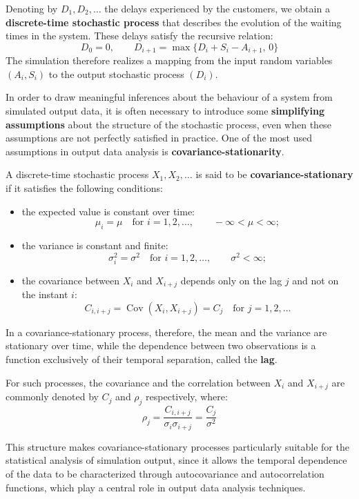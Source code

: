 Denoting by $D_1, D_2, \dots$ the delays experienced by the customers, we obtain a \textbf{discrete-time stochastic process} that describes the evolution of the waiting times in the system. These delays satisfy the recursive relation:
\[
D_0 = 0, \qquad
D_{i+1} = \max\{D_i + S_i - A_{i+1},\, 0\}
\]
The simulation therefore realizes a mapping from the input random variables $(A_i, S_i)$ to the output stochastic process $(D_i)$.

In order to draw meaningful inferences about the behaviour of a system from simulated output data, it is often necessary to introduce some \textbf{simplifying assumptions} about the structure of the stochastic process, even when these assumptions are not perfectly satisfied in practice. One of the most used assumptions in output data analysis is \textbf{covariance-stationarity}.

A discrete-time stochastic process $X_1, X_2, \dots$ is said to be \textbf{covariance-stationary} if it satisfies the following conditions:
\begin{itemize}
    \item the expected value is constant over time:
    \[
    \mu_i = \mu \quad \text{for } i = 1,2,\dots, \qquad -\infty < \mu < \infty;
    \]
    \item the variance is constant and finite:
    \[
    \sigma_i^2 = \sigma^2 \quad \text{for } i = 1,2,\dots, \qquad \sigma^2 < \infty;
    \]
    \item the covariance between $X_i$ and $X_{i+j}$ depends only on the lag $j$ and not on the instant $i$:
    \[
    C_{i,i+j} = \operatorname{Cov}(X_i, X_{i+j}) = C_j \quad \text{for } j = 1,2,\dots
    \]
\end{itemize}

In a covariance-stationary process, therefore, the mean and the variance are stationary over time, while the dependence between two observations is a function exclusively of their temporal separation, called the \textbf{lag}.

For such processes, the covariance and the correlation between $X_i$ and $X_{i+j}$ are commonly denoted by $C_j$ and $\rho_j$ respectively, where:
\[
\rho_j = \frac{C_{i,i+j}}{\sigma_i \sigma_{i+j}} = \frac{C_j}{\sigma^2}
\]

This structure makes covariance-stationary processes particularly suitable for the statistical analysis of simulation output, since it allows the temporal dependence of the data to be characterized through autocovariance and autocorrelation functions, which play a central role in output data analysis techniques.

